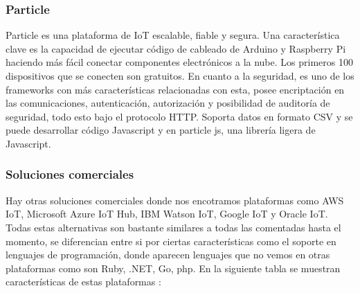 \subsubsection{Particle}

Particle es una plataforma de IoT escalable, fiable y segura. Una característica clave es la capacidad de ejecutar código de cableado de Arduino y Raspberry Pi haciendo más fácil conectar componentes electrónicos a la nube. Los primeros 100 dispositivos que se conecten son gratuitos. En cuanto a la seguridad, es uno de los frameworks con más características relacionadas con esta, posee encriptación en las comunicaciones, autenticación, autorización y posibilidad de auditoría de seguridad, todo esto bajo el protocolo HTTP. Soporta datos en formato CSV y se puede desarrollar código Javascript y en particle js, una librería ligera de Javascript.

\subsubsection{Soluciones comerciales}

Hay otras soluciones comerciales donde nos encotramos plataformas como AWS IoT, Microsoft Azure IoT Hub, IBM Watson IoT, Google IoT y Oracle IoT. Todas estas alternativas son bastante similares a todas las comentadas hasta el momento, se diferencian entre si por ciertas características como el soporte en lenguajes de programación, donde aparecen lenguajes que no vemos en otras plataformas como son Ruby, .NET, Go, php. En la siguiente tabla se muestran características de estas plataformas : 


